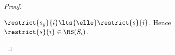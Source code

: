 \begin{proof}
\begin{description}
$\restrict{s_y}{i}\lts{\elle}\restrict{s}{i}$. Hence $\restrict{s}{i}\in \RS(S_i)$.
\end{description}
%
%
%
%

\end{proof}
